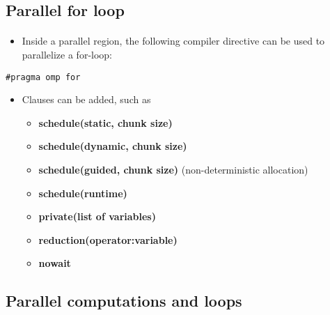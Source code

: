 \subsection*{Parallel for loop}

\paragraph{}
\begin{itemize}
 \item Inside a parallel region, the following compiler directive can be used to parallelize a for-loop:
\end{itemize}

\noindent


\begin{verbatim}
#pragma omp for

\end{verbatim}

\begin{itemize}
\item Clauses can be added, such as
\begin{itemize}

  \item \textbf{schedule(static, chunk size)}

  \item \textbf{schedule(dynamic, chunk size)} 

  \item \textbf{schedule(guided, chunk size)} (non-deterministic allocation)

  \item \textbf{schedule(runtime)}

  \item \textbf{private(list of variables)}

  \item \textbf{reduction(operator:variable)}

  \item \textbf{nowait}
\end{itemize}

\noindent
\end{itemize}

\noindent



\subsection*{Parallel computations and loops}


